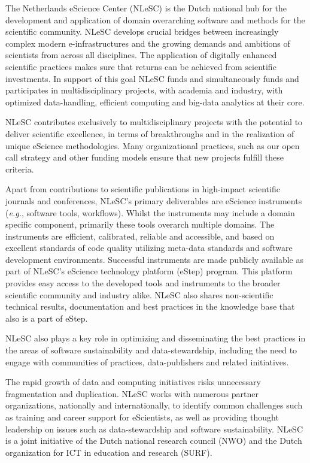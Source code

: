 \documentclass[a4paper,UKenglish]{dagrep}
\newcommand{\eg}{\emph{e.g.},\xspace}
\begin{document}

The Netherlands eScience Center (NLeSC) is the Dutch national hub for
the development and application of domain overarching software and
methods for the scientific community. NLeSC develops crucial bridges
between increasingly complex modern e-infrastructures and the growing
demands and ambitions of scientists from across all disciplines. The
application of digitally enhanced scientific practices makes sure that
returns can be achieved from scientific investments. In support of this
goal NLeSC funds and simultaneously funds and participates in
multidisciplinary projects, with academia and industry, with optimized
data-handling, efficient computing and big-data analytics at their
core.

NLeSC contributes exclusively to multidisciplinary projects with the
potential to deliver scientific excellence, in terms of breakthroughs
and in the realization of unique eScience methodologies. Many
organizational practices, such as our open call strategy and other
funding models ensure that new projects fulfill these criteria.

Apart from contributions to scientific publications in high-impact
scientific journals and conferences, NLeSC's primary deliverables are
eScience instruments (\eg software tools, workflows). Whilst the
instruments may include a domain specific component, primarily these
tools overarch multiple domains. The instruments are efficient,
calibrated, reliable and accessible, and based on excellent standards
of code quality utilizing meta-data standards and software development
environments. Successful instruments are made publicly available as
part of NLeSC's eScience technology platform (eStep) program. This
platform provides easy access to the developed tools and instruments
to the broader scientific community and industry alike. NLeSC also
shares non-scientific technical results, documentation and best
practices in the knowledge base that also is a part of eStep.

NLeSC also plays a key role in optimizing and disseminating the best
practices in the areas of software sustainability and
data-stewardship, including the need to engage with communities of
practices, data-publishers and related initiatives.

The rapid growth of data and computing initiatives risks unnecessary
fragmentation and duplication. NLeSC works with numerous partner
organizations, nationally and internationally, to identify common
challenges such as training and career support for eScientists, as
well as providing thought leadership on issues such as
data-stewardship and software sustainability. NLeSC is a joint
initiative of the Dutch national research council (NWO) and the Dutch
organization for ICT in education and research (SURF).
\end{document}
